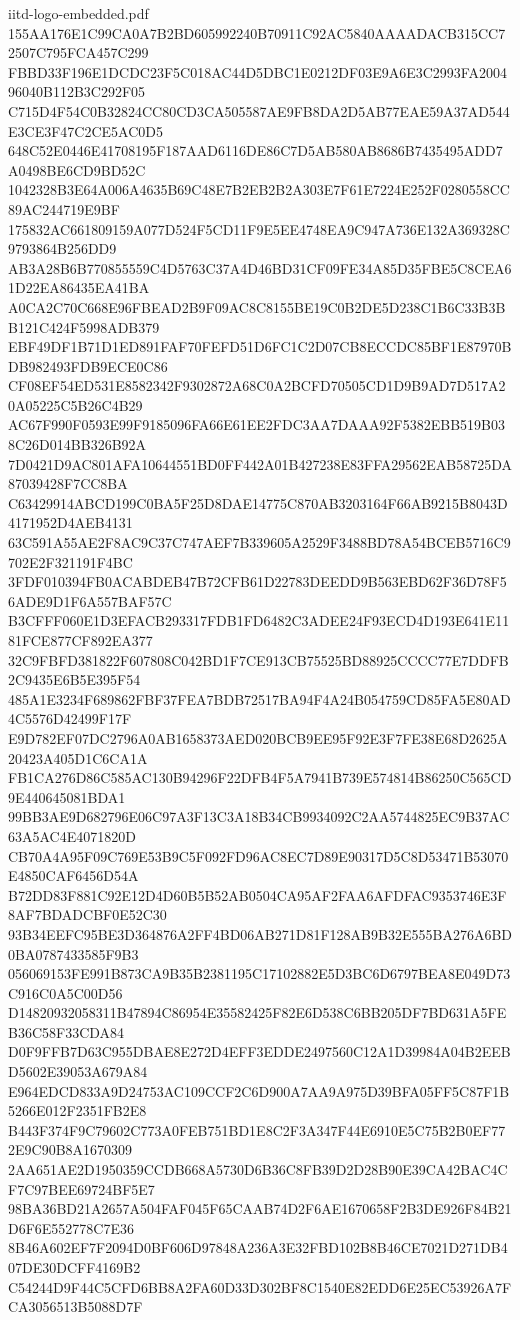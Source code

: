 \begin{filecontents*}[overwrite]{iitd-logo-embedded.pdf}
155AA176E1C99CA0A7B2BD605992240B70911C92AC5840AAAADACB315CC72507C795FCA457C299
FBBD33F196E1DCDC23F5C018AC44D5DBC1E0212DF03E9A6E3C2993FA200496040B112B3C292F05
C715D4F54C0B32824CC80CD3CA505587AE9FB8DA2D5AB77EAE59A37AD544E3CE3F47C2CE5AC0D5
648C52E0446E41708195F187AAD6116DE86C7D5AB580AB8686B7435495ADD7A0498BE6CD9BD52C
1042328B3E64A006A4635B69C48E7B2EB2B2A303E7F61E7224E252F0280558CC89AC244719E9BF
175832AC661809159A077D524F5CD11F9E5EE4748EA9C947A736E132A369328C9793864B256DD9
AB3A28B6B770855559C4D5763C37A4D46BD31CF09FE34A85D35FBE5C8CEA61D22EA86435EA41BA
A0CA2C70C668E96FBEAD2B9F09AC8C8155BE19C0B2DE5D238C1B6C33B3BB121C424F5998ADB379
EBF49DF1B71D1ED891FAF70FEFD51D6FC1C2D07CB8ECCDC85BF1E87970BDB982493FDB9ECE0C86
CF08EF54ED531E8582342F9302872A68C0A2BCFD70505CD1D9B9AD7D517A20A05225C5B26C4B29
AC67F990F0593E99F9185096FA66E61EE2FDC3AA7DAAA92F5382EBB519B038C26D014BB326B92A
7D0421D9AC801AFA10644551BD0FF442A01B427238E83FFA29562EAB58725DA87039428F7CC8BA
C63429914ABCD199C0BA5F25D8DAE14775C870AB3203164F66AB9215B8043D4171952D4AEB4131
63C591A55AE2F8AC9C37C747AEF7B339605A2529F3488BD78A54BCEB5716C9702E2F321191F4BC
3FDF010394FB0ACABDEB47B72CFB61D22783DEEDD9B563EBD62F36D78F56ADE9D1F6A557BAF57C
B3CFFF060E1D3EFACB293317FDB1FD6482C3ADEE24F93ECD4D193E641E1181FCE877CF892EA377
32C9FBFD381822F607808C042BD1F7CE913CB75525BD88925CCCC77E7DDFB2C9435E6B5E395F54
485A1E3234F689862FBF37FEA7BDB72517BA94F4A24B054759CD85FA5E80AD4C5576D42499F17F
E9D782EF07DC2796A0AB1658373AED020BCB9EE95F92E3F7FE38E68D2625A20423A405D1C6CA1A
FB1CA276D86C585AC130B94296F22DFB4F5A7941B739E574814B86250C565CD9E440645081BDA1
99BB3AE9D682796E06C97A3F13C3A18B34CB9934092C2AA5744825EC9B37AC63A5AC4E4071820D
CB70A4A95F09C769E53B9C5F092FD96AC8EC7D89E90317D5C8D53471B53070E4850CAF6456D54A
B72DD83F881C92E12D4D60B5B52AB0504CA95AF2FAA6AFDFAC9353746E3F8AF7BDADCBF0E52C30
93B34EEFC95BE3D364876A2FF4BD06AB271D81F128AB9B32E555BA276A6BD0BA0787433585F9B3
056069153FE991B873CA9B35B2381195C17102882E5D3BC6D6797BEA8E049D73C916C0A5C00D56
D14820932058311B47894C86954E35582425F82E6D538C6BB205DF7BD631A5FEB36C58F33CDA84
D0F9FFB7D63C955DBAE8E272D4EFF3EDDE2497560C12A1D39984A04B2EEBD5602E39053A679A84
E964EDCD833A9D24753AC109CCF2C6D900A7AA9A975D39BFA05FF5C87F1B5266E012F2351FB2E8
B443F374F9C79602C773A0FEB751BD1E8C2F3A347F44E6910E5C75B2B0EF772E9C90B8A1670309
2AA651AE2D1950359CCDB668A5730D6B36C8FB39D2D28B90E39CA42BAC4CF7C97BEE69724BF5E7
98BA36BD21A2657A504FAF045F65CAAB74D2F6AE1670658F2B3DE926F84B21D6F6E552778C7E36
8B46A602EF7F2094D0BF606D97848A236A3E32FBD102B8B46CE7021D271DB407DE30DCFF4169B2
C54244D9F44C5CFD6BB8A2FA60D33D302BF8C1540E82EDD6E25EC53926A7FCA3056513B5088D7F

\end{filecontents*}
